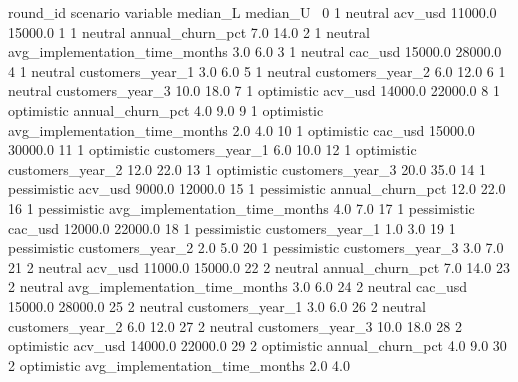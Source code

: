 \begin{APACode}
    round_id     scenario                        variable  median_L  median_U  \
0          1      neutral                         acv_usd   11000.0   15000.0   
1          1      neutral                annual_churn_pct       7.0      14.0   
2          1      neutral  avg_implementation_time_months       3.0       6.0   
3          1      neutral                         cac_usd   15000.0   28000.0   
4          1      neutral                customers_year_1       3.0       6.0   
5          1      neutral                customers_year_2       6.0      12.0   
6          1      neutral                customers_year_3      10.0      18.0   
7          1   optimistic                         acv_usd   14000.0   22000.0   
8          1   optimistic                annual_churn_pct       4.0       9.0   
9          1   optimistic  avg_implementation_time_months       2.0       4.0   
10         1   optimistic                         cac_usd   15000.0   30000.0   
11         1   optimistic                customers_year_1       6.0      10.0   
12         1   optimistic                customers_year_2      12.0      22.0   
13         1   optimistic                customers_year_3      20.0      35.0   
14         1  pessimistic                         acv_usd    9000.0   12000.0   
15         1  pessimistic                annual_churn_pct      12.0      22.0   
16         1  pessimistic  avg_implementation_time_months       4.0       7.0   
17         1  pessimistic                         cac_usd   12000.0   22000.0   
18         1  pessimistic                customers_year_1       1.0       3.0   
19         1  pessimistic                customers_year_2       2.0       5.0   
20         1  pessimistic                customers_year_3       3.0       7.0   
21         2      neutral                         acv_usd   11000.0   15000.0   
22         2      neutral                annual_churn_pct       7.0      14.0   
23         2      neutral  avg_implementation_time_months       3.0       6.0   
24         2      neutral                         cac_usd   15000.0   28000.0   
25         2      neutral                customers_year_1       3.0       6.0   
26         2      neutral                customers_year_2       6.0      12.0   
27         2      neutral                customers_year_3      10.0      18.0   
28         2   optimistic                         acv_usd   14000.0   22000.0   
29         2   optimistic                annual_churn_pct       4.0       9.0   
30         2   optimistic  avg_implementation_time_months       2.0       4.0   

\end{APACode}
